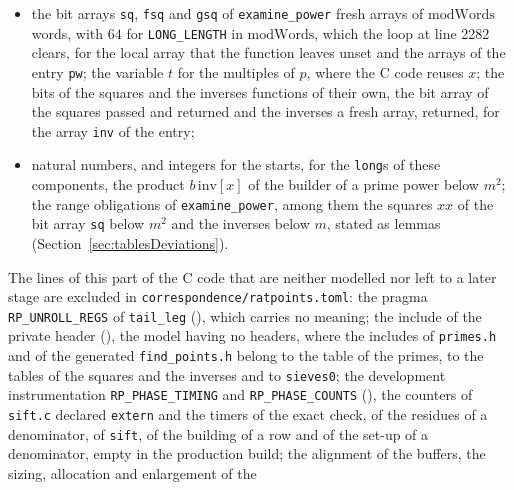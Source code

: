 \begin{itemize}
    and no output under \verb|DEBUG|. The reading again itself is modelled: with one thread it finds
    a row that an earlier spec of the same denominator built into the same table of rows, when a
    prime or a prime power occurs twice among the moduli of the first two stages or comes after a
    product among them that has it as a factor, cases that the contracts of the model admit and
    ratpoints never has (Section~\ref{sec:rowsC}); a product that occurs twice has a table of rows
    of its own at each position, so that its reading again finds nothing;
  \item the bit arrays \verb|sq|, \verb|fsq| and \verb|gsq| of \verb|examine_power| fresh arrays of
    $\mathrm{modWords}$ words, with $64$ for \verb|LONG_LENGTH| in $\mathrm{modWords}$, which the
    loop at line 2282 clears, for the local array that the function leaves unset and the arrays of
    the entry \verb|pw|; the variable $t$ for the multiples of $p$, where the C code reuses $x$; the
    bits of the squares and the inverses functions of their own, the bit array of the squares passed
    and returned and the inverses a fresh array, returned, for the array \verb|inv| of the entry;
  \item natural numbers, and integers for the starts, for the \verb|long|s of these components, the
    product $b\,\mathrm{inv}[x]$ of the builder of a prime power below $m^2$; the range obligations
    of \verb|examine_power|, among them the squares $x x$ of the bit array \verb|sq| below $m^2$ and
    the inverses below $m$, stated as lemmas (Section~\ref{sec:tablesDeviations}).
\end{itemize}
The lines of this part of the C code that are neither modelled nor left to a later stage are
excluded in \verb|correspondence/ratpoints.toml|: the pragma \verb|RP_UNROLL_REGS| of
\verb|tail_leg| (), which carries no meaning; the include of the private
header (), the model having no headers, where the includes of
\verb|primes.h| and of the generated \verb|find_points.h| belong to the table of the primes, to the
tables of the squares and the inverses and to \verb|sieves0|; the development instrumentation
\verb|RP_PHASE_TIMING| and \verb|RP_PHASE_COUNTS| (), the counters
of \verb|sift.c| declared \verb|extern| and the timers of the exact check, of the residues of a
denominator, of \verb|sift|, of the building of a row and of the set-up of a denominator, empty in
the production build; the alignment of the buffers, the sizing, allocation and enlargement of the
